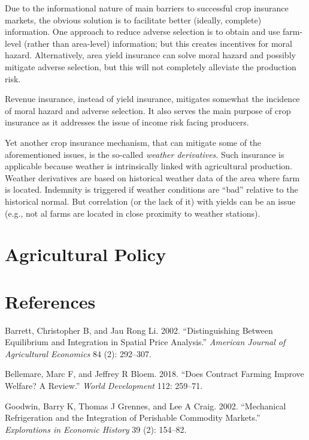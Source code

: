 \documentclass[
]{book}
\begin{document}
Due to the informational nature of main barriers to successful crop insurance markets, the obvious solution is to facilitate better (ideally, complete) information. One approach to reduce adverse selection is to obtain and use farm-level (rather than area-level) information; but this creates incentives for moral hazard. Alternatively, area yield insurance can solve moral hazard and possibly mitigate adverse selection, but this will not completely alleviate the production risk.

Revenue insurance, instead of yield insurance, mitigates somewhat the incidence of moral hazard and adverse selection. It also serves the main purpose of crop insurance as it addresses the issue of income risk facing producers.

Yet another crop insurance mechanism, that can mitigate some of the aforementioned issues, is the so-called \emph{weather derivatives}. Such insurance is applicable because weather is intrinsically linked with agricultural production. Weather derivatives are based on historical weather data of the area where farm is located. Indemnity is triggered if weather conditions are ``bad'' relative to the historical normal. But correlation (or the lack of it) with yields can be an issue (e.g., not al farms are located in close proximity to weather stations).

\hypertarget{agricultural-policy}{%
\chapter{Agricultural Policy}\label{agricultural-policy}}

\hypertarget{references}{%
\chapter*{References}\label{references}}

\hypertarget{refs}{}
\leavevmode\hypertarget{ref-barrett2002}{}%
Barrett, Christopher B, and Jau Rong Li. 2002. ``Distinguishing Between Equilibrium and Integration in Spatial Price Analysis.'' \emph{American Journal of Agricultural Economics} 84 (2): 292--307.

\leavevmode\hypertarget{ref-bellemare2018}{}%
Bellemare, Marc F, and Jeffrey R Bloem. 2018. ``Does Contract Farming Improve Welfare? A Review.'' \emph{World Development} 112: 259--71.

\leavevmode\hypertarget{ref-goodwin2002}{}%
Goodwin, Barry K, Thomas J Grennes, and Lee A Craig. 2002. ``Mechanical Refrigeration and the Integration of Perishable Commodity Markets.'' \emph{Explorations in Economic History} 39 (2): 154--82.
\end{document}
